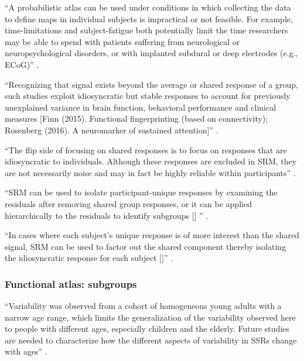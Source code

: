 ``A probabilistic atlas can be used under conditions in which collecting
the data to define maps in individual subjects is impractical or not feasible.
%
For example, time-limitations and subject-fatigue both potentially limit the
time researchers may be able to spend with patients suffering from
neurological or neuropsychological disorders, or with implanted subdural or deep
electrodes (e.g., ECoG)'' \citep{wang2015probabilistic}.





``Recognizing that signal exists beyond the average or shared response of a
group, such studies exploit idiosyncratic but stable responses to account for
previously unexplained variance in brain function, behavioral performance and
clinical measures [Finn (2015). Functional fingerprinting (based on
connectivity); Rosenberg (2016). A neuromarker of sustained attention]''
\citep{cohen2017computational}.

``The flip side of focusing on shared responses is to focus on responses that
are idiosyncratic to individuals.
%
Although these responses are excluded in SRM, they are not necessarily noise and
may in fact be highly reliable within participants''
\citep{cohen2017computational}.

``SRM can be used to isolate participant-unique responses by examining the
residuals after removing shared group responses, or it can be applied
hierarchically to the residuals to identify subgroups [\citet{chen2017shared}]
'' \citep{cohen2017computational}.


``In cases where each subject's unique response is of more interest
than the shared signal, SRM can be used to factor out the shared component
thereby isolating the idiosyncratic response for each subject
[\citep{chen2015reduced}]'' \citep{kumar2020brainiak}.


\subsubsection{Functional atlas: subgroups}

``Variability was observed from a cohort of homogeneous young adults with a
narrow age range, which limits the generalization of the variability observed
here to people with different ages, especially children and the elderly.
%
Future studies are needed to characterize how the different aspects of
variability in SSRs change with ages'' \citet{zhen2017quantifying}.

